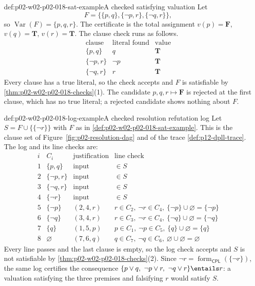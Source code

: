 \begin{hbexample}{def:p02-w02-p02-018-sat-example}{A checked satisfying valuation}
Let
\[
 F=\bigl\{\{p,q\},\{\neg p,r\},\{\neg q,r\}\bigr\},
\]
so \(\operatorname{Var}(F)=\{p,q,r\}\).  The certificate is the total assignment
\(v(p)=\mathbf F\), \(v(q)=\mathbf T\), \(v(r)=\mathbf T\).  The clause check
runs as follows.
\[
\begin{array}{lll}
\text{clause} & \text{literal found} & \text{value}\\\hline
\{p,q\} & q & \mathbf T\\
\{\neg p,r\} & \neg p & \mathbf T\\
\{\neg q,r\} & r & \mathbf T
\end{array}
\]
Every clause has a true literal, so the check accepts and \(F\) is satisfiable
by \cref{thm:p02-w02-p02-018-checks}(1).  The candidate
\(p,q,r\mapsto\mathbf F\) is rejected at the first clause, which has no true
literal; a rejected candidate shows nothing about \(F\).
\end{hbexample}

\begin{hbexample}{def:p02-w02-p02-018-log-example}{A checked resolution refutation log}
Let \(S=F\cup\bigl\{\{\neg r\}\bigr\}\) with \(F\) as in
\cref{def:p02-w02-p02-018-sat-example}.  This is the clause set of
Figure~\ref{fig:p02-resolution-dag} and of the trace
\cref{def:p12-dpll-trace}.  The log and its line checks are:
\[
\begin{array}{rlll}
i & C_i & \text{justification} & \text{line check}\\\hline
1 & \{p,q\} & \text{input} & \in S\\
2 & \{\neg p,r\} & \text{input} & \in S\\
3 & \{\neg q,r\} & \text{input} & \in S\\
4 & \{\neg r\} & \text{input} & \in S\\
5 & \{\neg p\} & (2,4,r) & r\in C_2,\ \neg r\in C_4,\
   \{\neg p\}\cup\varnothing=\{\neg p\}\\
6 & \{\neg q\} & (3,4,r) & r\in C_3,\ \neg r\in C_4,\
   \{\neg q\}\cup\varnothing=\{\neg q\}\\
7 & \{q\} & (1,5,p) & p\in C_1,\ \neg p\in C_5,\
   \{q\}\cup\varnothing=\{q\}\\
8 & \varnothing & (7,6,q) & q\in C_7,\ \neg q\in C_6,\
   \varnothing\cup\varnothing=\varnothing
\end{array}
\]
Every line passes and the last clause is empty, so the log check accepts and
\(S\) is not satisfiable by \cref{thm:p02-w02-p02-018-checks}(2).  Since
\(\neg r=\operatorname{form}_{\mathsf{CPL}}(\{\neg r\})\), the same log
certifies the consequence
\(\{p\lor q,\ \neg p\lor r,\ \neg q\lor r\}\entails r\): a valuation
satisfying the three premises and falsifying \(r\) would satisfy \(S\).
\end{hbexample}

